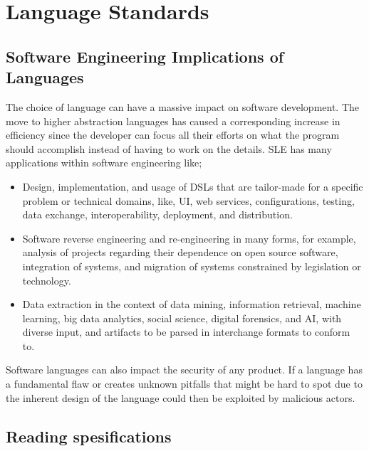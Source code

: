 \chapter{Language Standards}

\section{Software Engineering Implications of Languages}
The choice of language can have a massive impact on software development. The move to higher abstraction languages has caused a corresponding increase in efficiency
since the developer can focus all their efforts on what the program should accomplish instead of having to work on the details. 
\gls{SLE} has many applications within software engineering like;

\begin{itemize}
    \item Design, implementation, and usage of DSLs that are tailor-made for a specific problem or technical domains, like, UI, web services, configurations, testing,
            data exchange, interoperability, deployment, and distribution.
    \item Software reverse engineering and re-engineering in many forms, for example, analysis of projects regarding their dependence on open source software,
            integration of systems, and migration of systems constrained by legislation or technology.
    \item Data extraction in the context of data mining, information retrieval, machine learning, big data analytics, social science, digital forensics, and AI, 
            with diverse input, and artifacts to be parsed in interchange formats to conform to.
\end{itemize}

Software languages can also impact the security of any product. If a language has a fundamental flaw or creates unknown pitfalls that might be hard to spot due to
the inherent design of the language could then be exploited by malicious actors. 

\section{Reading spesifications}
